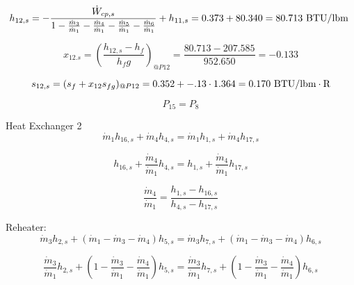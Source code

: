 \documentclass{article}
\begin{document}
\begin{equation}
h_{12,s} = -\frac{\dot{W}_{cp,s}}{1 - \frac{\dot{m}_{ 3}}{\dot{m}_{ 1}} - \frac{\dot{m}_{ 4}}{\dot{m}_{ 1}} - \frac{\dot{m}_{ 5}}{\dot{m}_{ 1}} - \frac{\dot{m}_{ 6}}{\dot{m}_{ 1}}} + h_{11,s} =    0.373 +   80.340 =   80.713\textnormal{ BTU/lbm                   }
\end{equation}

\begin{equation}
x_{12.s} = (\frac{h_{12,s} - h_{f}}{h_fg})_{@P12} = \frac{  80.713 -  207.585}{ 952.650} =   -0.133
\end{equation}

\begin{equation}
  s_{12,s} = (s_{f} + x_{12}s_{fg})_{@P12} =    0.352 + -.13\cdot   1.364 =    0.170
\textnormal{ BTU/lbm}\cdot\textnormal{R}
\end{equation}

\begin{equation}
P_{15} = P_{ 8}
\end{equation}


Heat Exchanger 2
\begin{equation}
\dot{m}_{ 1}h_{16,s} + \dot{m}_{ 4}h_{ 4,s} = \dot{m}_{ 1}h_{ 1,s} + \dot{m}_{ 4}h_{17,s}
\end{equation}

\begin{equation}
h_{16,s} + \frac{\dot{m}_{ 4}}{\dot{m}_{ 1}}h_{ 4,s} = h_{ 1,s} + \frac{\dot{m}_{ 4}}{\dot{m}_{ 1}}h_{17,s}
\end{equation}

\begin{equation}
\frac{\dot{m}_{4}}{\dot{m}_{1}} = \frac{h_{1,s} - h_{16,s}}{h_{4,s} - h_{17,s}}
\end{equation}


Reheater:
\begin{equation}
\dot{m}_{ 3}h_{ 2,s} + (\dot{m}_{ 1} - \dot{m}_{ 3} - \dot{m}_{ 4})h_{ 5,s} = \dot{m}_{ 3}h_{ 7,s} + (\dot{m}_{ 1} - \dot{m}_{ 3} - \dot{m}_{ 4})h_{ 6,s}
\end{equation}

\begin{equation}
\frac{\dot{m}_{ 3}}{\dot{m}_{ 1}}h_{ 2,s} + (1 - \frac{\dot{m}_{ 3}}{\dot{m}_{ 1}} - \frac{\dot{m}_{ 4}}{\dot{m}_{ 1}})h_{ 5,s} = \frac{\dot{m}_{ 3}}{\dot{m}_{ 1}}h_{ 7,s} + (1 - \frac{\dot{m}_{ 3}}{\dot{m}_{ 1}} - \frac{\dot{m}_{ 4}}{\dot{m}_{ 1}})h_{ 6,s}
\end{equation}
\end{document}
